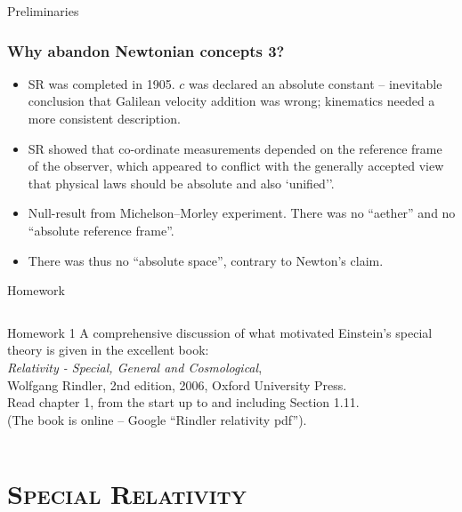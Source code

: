 \documentclass[xcolor=x11names,compress]{beamer}
\renewcommand{\(}{\begin{columns}}
\renewcommand{\)}{\end{columns}}
\newcommand{\<}[1]{\begin{column}{#1}}
\renewcommand{\>}{\end{column}}
\begin{document}
\begin{frame}{Preliminaries}
\frametitle{Why abandon Newtonian concepts 3?}
\begin{itemize}
\item SR was completed in 1905.  $c$ was declared an absolute constant --
inevitable conclusion that Galilean velocity addition was wrong;
kinematics needed a more consistent description.
\item SR showed that co-ordinate measurements depended on the reference
frame of the observer, which appeared to conflict with the generally
accepted view that physical laws should be absolute and also `unified''.
\item Null-result from Michelson--Morley experiment.  There was no 
``aether'' and no ``absolute reference frame''.
\item There was thus no ``absolute space'', contrary to Newton's claim.
\end{itemize}
\end{frame}

\begin{frame}{Homework}
\begin{columns}
\column{\textwidth}
\begin{beamerboxesrounded}[upper=uppercol,lower=lowercol,shadow=true]{Homework 1}
A comprehensive discussion of what motivated Einstein's special
theory is given in the excellent book:\\
{\it Relativity - Special, General and Cosmological},\\
Wolfgang Rindler, 2nd edition, 2006, Oxford University Press.\\

Read chapter 1, from the start up to and including Section 1.11.\\

(The book is online -- Google ``Rindler relativity pdf'').
\end{beamerboxesrounded}
\end{columns}
\end{frame}

\section{\scshape Special Relativity}
\end{document}
